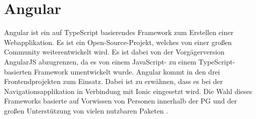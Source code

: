 \section{Angular}
Angular ist ein auf TypeScript basierendes Framework zum Erstellen einer Webapplikation. 
Es ist ein Open-Source-Projekt, welches von einer großen Community weiterentwickelt wird. 
Es ist dabei von der Vorgägerversion AngularJS abzugrenzen, da es von einem JavaScript- zu einem TypeScript-basierten Framework umentwickelt wurde.
Angular kommt in den drei Frontendprojekten zum Einsatz. 
Dabei ist zu erwähnen, dass es bei der Navigationsapplikation in Verbindung mit Ionic eingesetzt wird. 
Die Wahl dieses Frameworks basierte auf Vorwissen von Personen innerhalb der PG und der großen Unterstützung von vielen nutzbaren Paketen\cite{AngularInfoPage} \cite{AngularArchitektur}.
